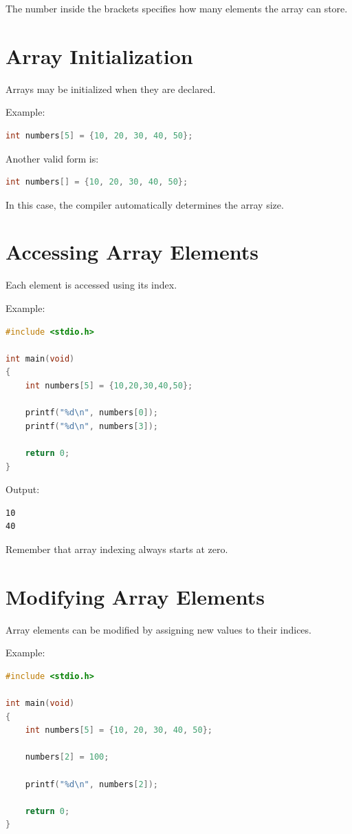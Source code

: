 \documentclass[12pt,openany]{book}
\begin{document}
The number inside the brackets specifies how many elements the array can store.

\section{Array Initialization}

Arrays may be initialized when they are declared.

Example:

\begin{lstlisting}[language=C]
int numbers[5] = {10, 20, 30, 40, 50};
\end{lstlisting}

Another valid form is:

\begin{lstlisting}[language=C]
int numbers[] = {10, 20, 30, 40, 50};
\end{lstlisting}

In this case, the compiler automatically determines the array size.

\section{Accessing Array Elements}

Each element is accessed using its index.

Example:

\begin{lstlisting}[language=C]
#include <stdio.h>

int main(void)
{
    int numbers[5] = {10,20,30,40,50};

    printf("%d\n", numbers[0]);
    printf("%d\n", numbers[3]);

    return 0;
}
\end{lstlisting}

Output:

\begin{lstlisting}
10
40
\end{lstlisting}

Remember that array indexing always starts at zero.
\section{Modifying Array Elements}

Array elements can be modified by assigning new values to their indices.

Example:

\begin{lstlisting}[language=C]
#include <stdio.h>

int main(void)
{
    int numbers[5] = {10, 20, 30, 40, 50};

    numbers[2] = 100;

    printf("%d\n", numbers[2]);

    return 0;
}
\end{lstlisting}
\end{document}
